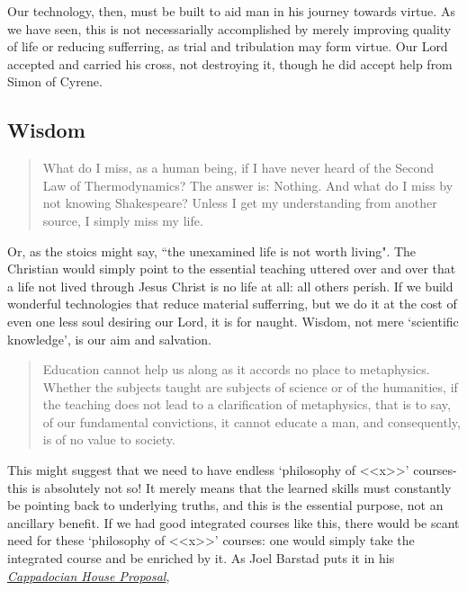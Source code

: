 \documentclass[letterpaper]{article}
\begin{document}
Our technology, then, must be built to aid man in his journey towards virtue. As we have seen, this is not necessarially accomplished by merely improving quality of life or reducing sufferring, as trial and tribulation may form virtue. Our Lord accepted and carried his cross, not destroying it, though he did accept help from Simon of Cyrene.

\subsection{Wisdom}

\begin{quote}
What do I miss, as a human being, if I have never heard of the Second Law of Thermodynamics? The answer is: Nothing. And what do I miss by not knowing Shakespeare? Unless I get my understanding from another source, I simply miss my life.
\end{quote}

Or, as the stoics might say, ``the unexamined life is not worth living". The Christian would simply point to the essential teaching uttered over and over that a life not lived through Jesus Christ is no life at all: all others perish. If we build wonderful technologies that reduce material sufferring, but we do it at the cost of even one less soul desiring our Lord, it is for naught. Wisdom, not mere `scientific knowledge', is our aim and salvation.

\iffalse
Indeed to harken back to Eden,

\begin{quote}
  Sorrow is knowledge; they who know the most
  Must mourn the deepest o'er the fatal truth,
  The Tree of Knowledge is not that of Life.
  \attrib{\textit{Manfred}, George Gordon Byron 1817}
\end{quote}
\fi

\begin{quote}
  Education cannot help us along as it accords no place to metaphysics. Whether the subjects taught are subjects of science or of the humanities, if the teaching does not lead to a clarification of metaphysics, that is to say, of our fundamental convictions, it cannot educate a man, and consequently, is of no value to society.
\end{quote}

This might suggest that we need to have endless `philosophy of <<x>>' courses- this is absolutely not so! It merely means that the learned skills must constantly be pointing back to underlying truths, and this is the essential purpose, not an ancillary benefit. If we had good integrated courses like this, there would be scant need for these `philosophy of <<x>>' courses: one would simply take the integrated course and be enriched by it. As Joel Barstad puts it in his \href{https://byzantinela.com/cappadocian-house-proposal/}{\textit{Cappadocian House Proposal}},
\end{document}

